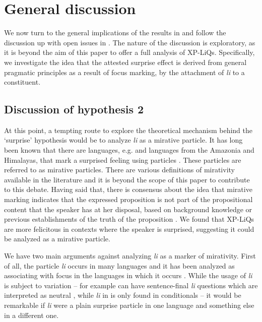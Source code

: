 \documentclass[output=paper,
colorlinks,
citecolor=brown,
newtxmath
]{langscibook}
\begin{document}
\section{General discussion}\label{sec:analysis}
We now turn to the general implications of the results in  and follow the discussion up with open issues in . The nature of the discussion is exploratory, as it is beyond the aim of this paper to offer a full analysis of XP-LiQs. Specifically, we investigate the idea that the attested surprise effect is derived from general pragmatic principles as a result of focus marking, by the attachment of \textit{li} to a constituent.

\subsection{Discussion of hypothesis 2}\label{sec:diss}
At this point, a tempting route to explore the theoretical mechanism behind the `surprise' hypothesis would be to analyze \textit{li} as a mirative particle. It has long been known that there are languages, e.g.  and languages from the Amazonia and Himalayas, that mark a surprised feeling using particles \citep{sudo2013,DeLancey2012}. These particles are referred to as mirative particles. There are various definitions of mirativity available in the literature and it is beyond the scope of this paper to contribute to this debate. Having said that, there is consensus about the idea that mirative marking indicates that the expressed proposition is not part of the propositional content that the speaker has at her disposal, based on background knowledge or previous establishments of the truth of the proposition \citep{DeLancey2012,Donabedian2001}. We found that XP-LiQs are more felicitous in contexts where the speaker is surprised, suggesting it could be analyzed as a mirative particle.

We have two main arguments against analyzing \textit{li} as a marker of mirativity. %
First of all, the particle \textit{li} occurs in many  languages and it has been ana\-lyzed as associating with focus in the languages in which it occurs \citep{schwabe2004}. While the usage of \textit{li} is subject to variation -- for example  can have sentence-final \textit{li} questions which are interpreted as neutral \citep{dukova2010}, while \textit{li} in  is only found in conditionals \citep{schwabe2004} -- it would be remarkable if \textit{li} were a plain surprise particle in one  language and something else in a different one.
\end{document}
